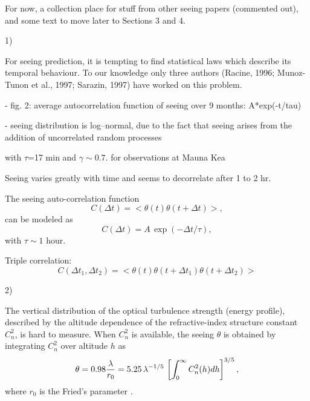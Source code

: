 
 
For now, a collection place for stuff from other seeing papers (commented out),
and some text to move later to Sections 3 and 4. 


1) \cite{VMT1998} 

For seeing prediction, it is tempting to find statistical laws which describe its temporal behaviour.
To our knowledge only three authors (Racine, 1996; Munoz-Tunon et al., 1997; Sarazin, 1997) 
have worked on this problem. 

- fig. 2: average autocorrelation function of seeing over 9 months:  A*exp(-t/tau) 

- seeing distribution is  log–normal, due to the fact that seeing arises from the addition of uncorrelated random processes


with $\tau$=17 min and $\gamma \sim 0.7$. for observations at Mauna Kea \cite{Racine1996}

Seeing varies greatly with time and seems to decorrelate after 1 to 2 hr. 

The seeing auto-correlation function
\begin{equation}
      C(\Delta t) = < \theta(t) \theta(t+\Delta t)>,
\end{equation} 
can be modeled as
\begin{equation}
      C(\Delta t) = A \, \exp(-\Delta t/\tau),
\end{equation} 
with $\tau \sim 1$ hour. 
 
Triple correlation:
\begin{equation}
      C(\Delta t_1, \Delta t_2) = < \theta(t) \theta(t+\Delta t_1)\theta(t+\Delta t_2) >
\end{equation} 

2) 

The vertical distribution of the optical turbulence strength (energy profile), described by the altitude 
dependence of the refractive-index structure constant $C^2_n$, is hard to measure. When $C^2_n$ 
is available, the seeing $\theta$ is obtained by integrating $C^2_n$ over altitude $h$ as 
\begin{equation}
   \theta =  0.98 {\lambda \over r_0} = 5.25 \, \lambda^{-1/5} \, \left[ \int_0^\infty C_n^2(h) dh \right]^{3/5},
\end{equation}
where $r_0$ is the Fried's parameter \cite{Roddier1981}. 






